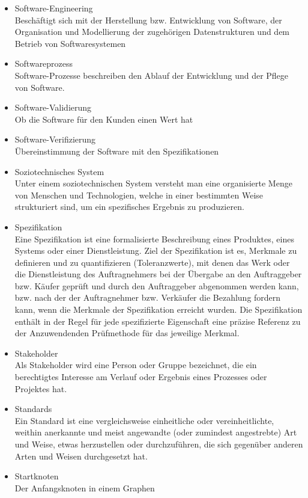 \begin{itemize}
\item 	Software-Engineering\\
Beschäftigt sich mit der Herstellung bzw. Entwicklung von Software, der Organisation und Modellierung der zugehörigen Datenstrukturen und dem Betrieb von Softwaresystemen
\item 	Softwareprozess\\Software-Prozesse beschreiben den Ablauf der Entwicklung und der Pflege von Software.
\item 	Software-Validierung \\  Ob die Software für den Kunden einen Wert hat
\item 	Software-Verifizierung \\ Übereinstimmung der Software mit den Spezifikationen
\item 	Soziotechnisches System\\Unter einem soziotechnischen System versteht man eine organisierte Menge von Menschen und Technologien, welche in einer bestimmten Weise strukturiert sind, um ein spezifisches Ergebnis zu produzieren.
\item 	Spezifikation\\Eine Spezifikation  ist eine formalisierte Beschreibung eines Produktes, eines Systems oder einer Dienstleistung. Ziel der Spezifikation ist es, Merkmale zu definieren und zu quantifizieren (Toleranzwerte), mit denen das Werk oder die Dienstleistung des Auftragnehmers bei der Übergabe an den Auftraggeber bzw. Käufer geprüft und durch den Auftraggeber abgenommen werden kann, bzw. nach der der Auftragnehmer bzw. Verkäufer die Bezahlung fordern kann, wenn die Merkmale der Spezifikation erreicht wurden. Die Spezifikation enthält in der Regel für jede spezifizierte Eigenschaft eine präzise Referenz zu der Anzuwendenden Prüfmethode für das jeweilige Merkmal.
\item 	Stakeholder\\
Als Stakeholder wird eine Person oder Gruppe bezeichnet, die ein berechtigtes Interesse am Verlauf oder Ergebnis eines Prozesses oder Projektes hat.
\item 	Standards\\Ein Standard ist eine vergleichsweise einheitliche oder vereinheitlichte, weithin anerkannte und meist angewandte (oder zumindest angestrebte) Art und Weise, etwas herzustellen oder durchzuführen, die sich gegenüber anderen Arten und Weisen durchgesetzt hat. 
\item 	Startknoten \\Der Anfangsknoten in einem Graphen

\end{itemize}
